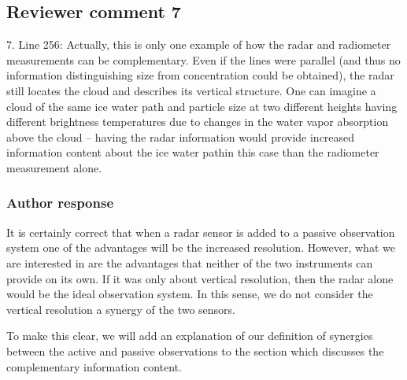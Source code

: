 \documentclass[11pt]{scrartcl}
\providecommand{\DIFadd}[1]{{\protect\textcolor{blue}{\uwave{#1}}}} %
\providecommand{\DIFaddFL}[1]{\DIFadd{#1}} %
\begin{document}
\begin{itemize}


\subsection*{Reviewer comment 7}

7. Line 256: Actually, this is only one example of how the radar and radiometer
measurements can be complementary. Even if the lines were parallel (and thus no
information distinguishing size from concentration could be obtained), the radar
still locates the cloud and describes its vertical structure. One can imagine a
cloud of the same ice water path and particle size at two different heights
having different brightness temperatures due to changes in the water vapor
absorption above the cloud – having the radar information would provide
increased information content about the ice water pathin this case than the
radiometer measurement alone.

\subsubsection*{Author response}

It is certainly correct that when a radar sensor is added to a passive
observation system one of the advantages will be the increased resolution.
However, what we are interested in are the advantages that neither of the two
instruments can provide on its own. If it was only about vertical resolution,
then the radar alone would be the ideal observation system. In this sense, we do
not consider the vertical resolution a synergy of the two sensors.

To make this clear, we will add an explanation of our definition of synergies
between the active and passive observations to the section which discusses the
complementary information content.



\end{itemize}
\end{document}
